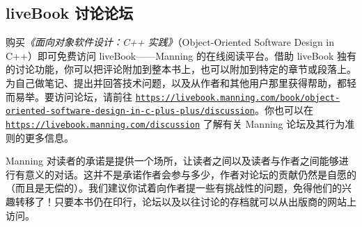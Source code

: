 \subsection{liveBook 讨论论坛}

购买\emph{《面向对象软件设计：C++ 实践》}（Object-Oriented Software Design in C++）即可免费访问 liveBook——Manning 的在线阅读平台。借助 liveBook 独有的讨论功能，你可以把评论附加到整本书上，也可以附加到特定的章节或段落上。为自己做笔记、提出并回答技术问题，以及从作者和其他用户那里获得帮助，都轻而易举。要访问论坛，请前往 \href{https://livebook.manning.com/book/object-oriented-software-design-in-c-plus-plus/discussion}{\nolinkurl{https://livebook.manning.com/book/object-oriented-software-design-in-c-plus-plus/discussion}}。你也可以在 \href{https://livebook.manning.com/discussion}{\nolinkurl{https://livebook.manning.com/discussion}} 了解有关 Manning 论坛及其行为准则的更多信息。

Manning 对读者的承诺是提供一个场所，让读者之间以及读者与作者之间能够进行有意义的对话。这并不是承诺作者会参与多少，作者对论坛的贡献仍然是自愿的（而且是无偿的）。我们建议你试着向作者提一些有挑战性的问题，免得他们的兴趣转移了！只要本书仍在印行，论坛以及以往讨论的存档就可以从出版商的网站上访问。
